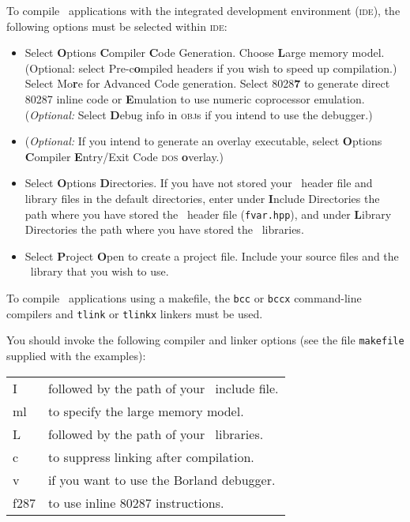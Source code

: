 \documentclass{admbmanual}
\makeatletter
\newenvironment{commandtable}
  {
    \par
    \begin{tabular}%
      {@{\vrule height 12pt depth7pt width0pt}@{\tt-}l @{\rm\quad} l}
  }
  {
    \end{tabular}
    \medskip
   }
\makeatother
\begin{document}
To compile \scAD\ applications with the integrated development environment
(\textsc{ide}), the following options must be selected within \textsc{ide}:
\begin{itemize}
  \item Select {\bf O}ptions {\bf C}ompiler {\bf C}ode Generation. Choose {\bf
    L}arge memory model. (Optional: select Pre-c{\bf o}mpiled headers if you
  wish to speed up compilation.) Select Mo{\bf r}e for Advanced Code generation.
  Select 8028{\bf 7} to generate direct 80287 inline code or {\bf E}mulation to
  use numeric coprocessor emulation. (\textit{Optional:} Select {\bf D}ebug info
  in \textsc{obj}s if you intend to use the debugger.)

  \item (\textit{Optional:} If you intend to generate an overlay executable,
  select {\bf O}ptions {\bf C}ompiler {\bf E}ntry/Exit Code \textsc{dos}
  {\bf o}verlay.)

  \item Select {\bf O}ptions {\bf D}irectories. If you have not stored your
  \scAD\ header file and library files in the default directories, enter under
  {\bf I}nclude Directories the path where you have stored the \scAD\ header
  file (\texttt{fvar.hpp}), and under {\bf L}ibrary Directories the path where
  you have stored the \scAD\ libraries.

  \item Select {\bf P}roject {\bf O}pen to create a project file. Include your
  source files and the \scAD\ library that you wish to use.
\end{itemize}

To compile \scAD\ applications using a makefile, the \texttt{bcc} or
\texttt{bccx} command-line compilers and \texttt{tlink} or \texttt{tlinkx}
linkers must be used.

You should invoke the following compiler and linker options (see the file
\texttt{makefile} supplied with the examples):
\begin{commandtable}
     I  &  followed by the path of your \scAD\ include file.\\
     ml  &  to specify the large memory model. \\
     L  &  followed by the path of your \scAD\ libraries.\\
    c  &  to suppress linking after compilation.\\
    v  &  if you want to use the Borland debugger.\\
    f287  &   to use inline 80287 instructions.\\
\end{commandtable}
\end{document}
